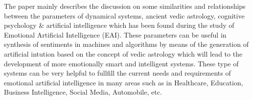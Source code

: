 The paper mainly describes the discussion on some similarities and relationships between the parameters of dynamical systems, ancient vedic astrology, cognitive psychology \& artificial intelligence which has been found during the study of Emotional Artificial Intelligence (EAI). These parameters can be useful in synthesis of sentiments in machines and algorithms by means of the generation of artificial intution based on the concept of vedic astrology which will lead to the development of more emotionally smart and intelligent systems. These type of systems can be very helpful to fullfill the current needs and requirements of emotional artificial intelligence in many areas such as in Healthcare, Education, Business Intelligence, Social Media, Automobile, etc.